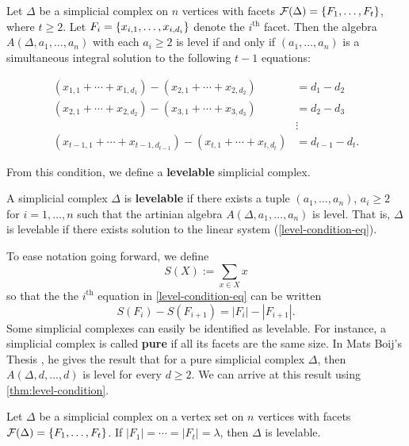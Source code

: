 \begin{theorem} \label{thm:level-condition} Let $\Delta$ be a simplicial complex on $n$ vertices with facets $\mathcal{F}(\Delta) = \{ F_1, \dots, F_t \}$, where $t \geq 2$. Let $F_i = \{ x_{i,1}, \dots, x_{i, d_i} \}$ denote the $i^{\textrm{th}}$ facet. Then the algebra $A(\Delta, a_1, \dots, a_n)$ with each $a_i \geq 2$ is level if and only if $(a_1, \dots, a_n)$ is a simultaneous integral solution to the following $t-1$ equations:

\begin{equation} \label{level-condition-eq}
\begin{aligned}
(x_{1, 1} + \cdots + x_{1, d_1}) - (x_{2, 1} + \cdots + x_{2, d_2}) &= d_1 - d_2 \\
(x_{2, 1} + \cdots + x_{2, d_2}) - (x_{3, 1} + \cdots + x_{3, d_3}) &= d_2 - d_3 \\
&\vdots \\
(x_{t-1, 1} + \cdots + x_{t-1, d_{t-1}}) - (x_{t, 1} + \cdots + x_{t, d_t}) &= d_{t-1} - d_t.
\end{aligned}
\end{equation}
\end{theorem}

From this condition, we define a \textbf{levelable} simplicial complex.
\begin{definition}
A simplicial complex $\Delta$ is \textbf{levelable} if there exists a tuple $(a_1, \dots, a_n)$, $a_i \geq 2$ for $i = 1, \dots, n$ such that the artinian algebra $A(\Delta, a_1, \dots, a_n)$ is level. That is, $\Delta$ is levelable if there exists solution to the linear system (\ref{level-condition-eq}). 
\end{definition}
To ease notation going forward, we define 
$$
S(X) := \sum_{x \in X} x
$$
so that the the $i^{\textrm{th}}$ equation in \eqref{level-condition-eq} can be written
$$
S(F_i) - S(F_{i+1}) = |F_i| - |F_{i+1}|.
$$
Some simplicial complexes can easily be identified as levelable. For instance, a simplicial complex is called \textbf{pure} if all its facets are the same size. In Mats Boij's Thesis \cite{Boij1994}, he gives the result that for a pure simplicial complex $\Delta$, then $A(\Delta, d, \dots, d)$ is level for every $d \geq 2$. We can arrive at this result using \autoref{thm:level-condition}. 

\begin{theorem} \label{thm:pure} 
Let $\Delta$ be a simplicial complex on a vertex set on $n$ vertices with facets $\mathcal{F}(\Delta) = \{ F_1, \dots, F_t \}$. If $|F_1| =  \cdots = |F_t| = \lambda$, then $\Delta$ is levelable.
\end{theorem}

